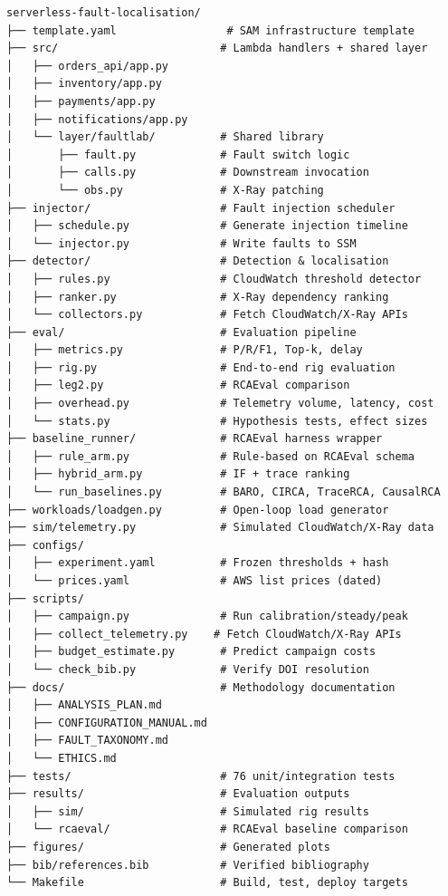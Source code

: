 \begin{verbatim}
serverless-fault-localisation/
├── template.yaml                 # SAM infrastructure template
├── src/                         # Lambda handlers + shared layer
│   ├── orders_api/app.py
│   ├── inventory/app.py
│   ├── payments/app.py
│   ├── notifications/app.py
│   └── layer/faultlab/          # Shared library
│       ├── fault.py             # Fault switch logic
│       ├── calls.py             # Downstream invocation
│       └── obs.py               # X-Ray patching
├── injector/                    # Fault injection scheduler
│   ├── schedule.py              # Generate injection timeline
│   └── injector.py              # Write faults to SSM
├── detector/                    # Detection & localisation
│   ├── rules.py                 # CloudWatch threshold detector
│   ├── ranker.py                # X-Ray dependency ranking
│   └── collectors.py            # Fetch CloudWatch/X-Ray APIs
├── eval/                        # Evaluation pipeline
│   ├── metrics.py               # P/R/F1, Top-k, delay
│   ├── rig.py                   # End-to-end rig evaluation
│   ├── leg2.py                  # RCAEval comparison
│   ├── overhead.py              # Telemetry volume, latency, cost
│   └── stats.py                 # Hypothesis tests, effect sizes
├── baseline_runner/             # RCAEval harness wrapper
│   ├── rule_arm.py              # Rule-based on RCAEval schema
│   ├── hybrid_arm.py            # IF + trace ranking
│   └── run_baselines.py         # BARO, CIRCA, TraceRCA, CausalRCA
├── workloads/loadgen.py         # Open-loop load generator
├── sim/telemetry.py             # Simulated CloudWatch/X-Ray data
├── configs/
│   ├── experiment.yaml          # Frozen thresholds + hash
│   └── prices.yaml              # AWS list prices (dated)
├── scripts/
│   ├── campaign.py              # Run calibration/steady/peak
│   ├── collect_telemetry.py    # Fetch CloudWatch/X-Ray APIs
│   ├── budget_estimate.py       # Predict campaign costs
│   └── check_bib.py             # Verify DOI resolution
├── docs/                        # Methodology documentation
│   ├── ANALYSIS_PLAN.md
│   ├── CONFIGURATION_MANUAL.md
│   ├── FAULT_TAXONOMY.md
│   └── ETHICS.md
├── tests/                       # 76 unit/integration tests
├── results/                     # Evaluation outputs
│   ├── sim/                     # Simulated rig results
│   └── rcaeval/                 # RCAEval baseline comparison
├── figures/                     # Generated plots
├── bib/references.bib           # Verified bibliography
└── Makefile                     # Build, test, deploy targets
\end{verbatim}


